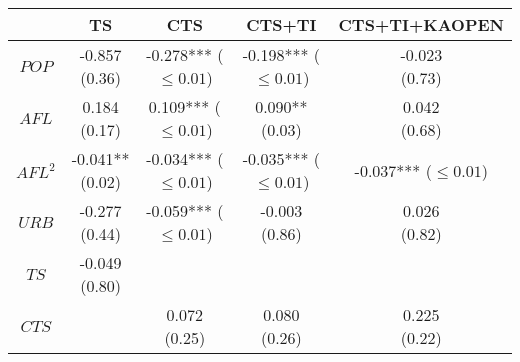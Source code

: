 \begin{tabular}{ccccc}
\toprule
                                               &                                    TS &                                   CTS &                                CTS+TI &                         CTS+TI+KAOPEN \\
\midrule
                                         $POP$ &             \makecell{-0.857\\(0.36)} &   \makecell{-0.278***\\($\leq 0.01$)} &   \makecell{-0.198***\\($\leq 0.01$)} &             \makecell{-0.023\\(0.73)} \\
                                         $AFL$ &              \makecell{0.184\\(0.17)} &    \makecell{0.109***\\($\leq 0.01$)} &            \makecell{0.090**\\(0.03)} &              \makecell{0.042\\(0.68)} \\
                                       $AFL^2$ &           \makecell{-0.041**\\(0.02)} &   \makecell{-0.034***\\($\leq 0.01$)} &   \makecell{-0.035***\\($\leq 0.01$)} &   \makecell{-0.037***\\($\leq 0.01$)} \\
                                         $URB$ &             \makecell{-0.277\\(0.44)} &   \makecell{-0.059***\\($\leq 0.01$)} &             \makecell{-0.003\\(0.86)} &              \makecell{0.026\\(0.82)} \\
                                          $TS$ &             \makecell{-0.049\\(0.80)} &                                       &                                       &                                       \\
                                         $CTS$ &                                       &              \makecell{0.072\\(0.25)} &              \makecell{0.080\\(0.26)} &              \makecell{0.225\\(0.22)} \\

\end{tabular}
